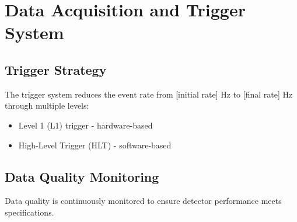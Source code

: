 \section{Data Acquisition and Trigger System}
\label{sec:EXPERIMENT_DATA_ACQUISITION_AND_TRIGGER_SYSTEM}

\subsection{Trigger Strategy}
\label{sec:EXPERIMENT_DATA_ACQUISITION_AND_TRIGGER_SYSTEM_TRIGGER_STRATEGY}

The trigger system reduces the event rate from [initial rate] Hz to [final rate] Hz through multiple levels:
\begin{itemize}
  \item Level 1 (L1) trigger - hardware-based
  \item High-Level Trigger (HLT) - software-based
\end{itemize}

\subsection{Data Quality Monitoring}
\label{sec:EXPERIMENT_DATA_ACQUISITION_AND_TRIGGER_SYSTEM_DATA_QUALITY_MONITORING}

Data quality is continuously monitored to ensure detector performance meets specifications.

